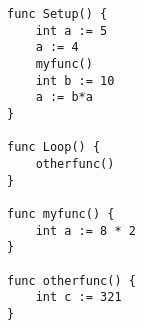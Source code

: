 \begin{lstlisting}[caption={Program structure similar to Arduino}]
func Setup() {
	int a := 5
	a := 4
	myfunc()
	int b := 10
	a := b*a
}

func Loop() {
	otherfunc()
}

func myfunc() {
	int a := 8 * 2
}

func otherfunc() {
	int c := 321
}
\end{lstlisting}